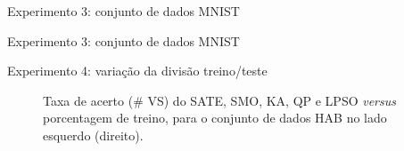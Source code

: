 \documentclass{beamer}
\newcommand\infe{\textcolor{gray}{\ding{55}}}
\newcommand\equi{\ding{51}}
\newcommand{\tabela}[3]{
\begin{table}[!htbp]
  \scalefont{#3}
  \begin{center}
  \caption{#2}\label{tab:#1}
    
  \end{center}
\end{table}
}
\begin{document}
\begin{frame}[noframenumbering]{Experimento 3: conjunto de dados MNIST}
\end{frame}

\begin{frame}[noframenumbering]{Experimento 3: conjunto de dados MNIST}
\end{frame}





\begin{frame}{Experimento 4: variação da divisão treino/teste}
\begin{figure}[!htbp]
    \centering
    \begin{subfigure}[b]{0.48\textwidth}
        \caption{}
    \end{subfigure}
    \begin{subfigure}[b]{0.48\textwidth}
        \caption{}
    \end{subfigure}
    
    
    \caption{Taxa de acerto (\# VS) do SATE, SMO, KA, QP e LPSO \textit{versus} porcentagem de treino, para o conjunto de dados HAB no lado esquerdo (direito).}\label{fig:accuracy_training_patterns}
\end{figure}
\end{frame}
\end{document}
